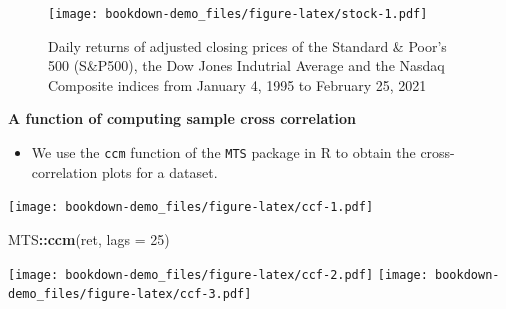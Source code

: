 \documentclass[]{book}
\newenvironment{Shaded}{\begin{snugshade}}{\end{snugshade}}
\newcommand{\DataTypeTok}[1]{\textcolor[rgb]{0.13,0.29,0.53}{#1}}
\newcommand{\DecValTok}[1]{\textcolor[rgb]{0.00,0.00,0.81}{#1}}
\newcommand{\KeywordTok}[1]{\textcolor[rgb]{0.13,0.29,0.53}{\textbf{#1}}}
\newcommand{\NormalTok}[1]{#1}
\newcommand{\OperatorTok}[1]{\textcolor[rgb]{0.81,0.36,0.00}{\textbf{#1}}}
\newcommand{\StringTok}[1]{\textcolor[rgb]{0.31,0.60,0.02}{#1}}
\providecommand{\tightlist}{%
  \setlength{\itemsep}{0pt}\setlength{\parskip}{0pt}}
\begin{document}
\begin{figure}
\centering
\texttt{[image: bookdown-demo\_files/figure-latex/stock-1.pdf]}
\caption{\label{fig:stock}Daily returns of adjusted closing prices of the Standard \& Poor's 500 (S\&P500), the Dow Jones Indutrial Average and the Nasdaq Composite indices from January 4, 1995 to February 25, 2021}
\end{figure}

\textbf{A function of computing sample cross correlation}

\begin{itemize}
\tightlist
\item
  We use the \texttt{ccm} function of the \texttt{MTS} package in R to obtain the cross-correlation plots for a dataset.
\end{itemize}

\begin{Shaded}
\end{Shaded}

\texttt{[image: bookdown-demo\_files/figure-latex/ccf-1.pdf]}

\begin{Shaded}
\begin{Highlighting}[]
\NormalTok{MTS}\OperatorTok{::}\KeywordTok{ccm}\NormalTok{(ret, }\DataTypeTok{lags =} \DecValTok{25}\NormalTok{)}
\end{Highlighting}
\end{Shaded}

\texttt{[image: bookdown-demo\_files/figure-latex/ccf-2.pdf]} \texttt{[image: bookdown-demo\_files/figure-latex/ccf-3.pdf]}
\end{document}

